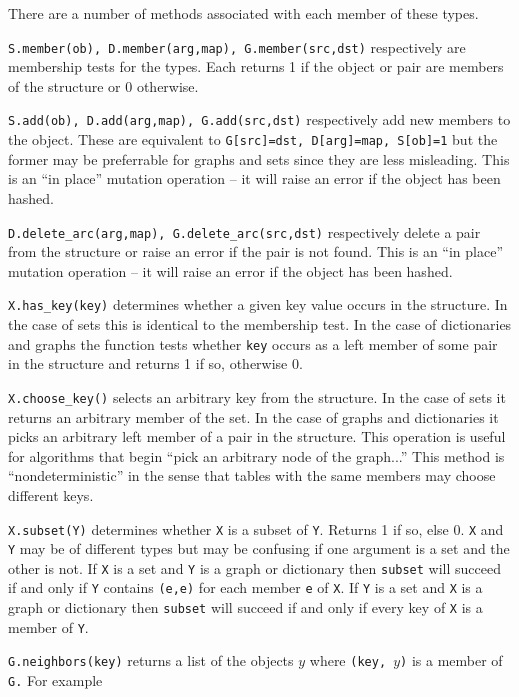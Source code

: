 There are a number of methods associated with each member of these
types.
\begin{description}
%
\item{\tt S.member(ob), D.member(arg,map), G.member(src,dst)}
respectively are membership tests for the types.  Each returns 1 if the object
or pair are members of the structure or 0 otherwise.
%
\item{\tt S.add(ob), D.add(arg,map), G.add(src,dst)}
respectively add new members to the object. These are equivalent to
{\tt G[src]=dst, D[arg]=map, S[ob]=1} but the former may be
preferrable for graphs and sets since they are less misleading.
This is an ``in place'' mutation operation -- it will raise an
error if the object has been hashed.
%
\item{\tt D.delete\_arc(arg,map), G.delete\_arc(src,dst)}
respectively delete a pair from the structure or raise an
error if the pair is not found.
This is an ``in place'' mutation operation -- it will raise an
error if the object has been hashed.
%
\item{\tt X.has\_key(key)}
determines whether a given key value occurs in the structure.
In the case of sets this is identical to the membership test.
In the case of dictionaries and graphs the function tests
whether {\tt key} occurs as a left member of some pair in the
structure and returns 1 if so, otherwise 0.
%
\item{\tt X.choose\_key()} selects an arbitrary key from the structure.
In the case of sets it returns an arbitrary member of the set.
In the case of graphs and dictionaries it picks an arbitrary left
member of a pair in the structure.  This operation is useful for
algorithms that begin ``pick an arbitrary node of the graph...''
This method is ``nondeterministic'' in the sense that tables with
the same members may choose different keys.
%
\item{\tt X.subset(Y)}
determines whether {\tt X} is a subset of {\tt Y}.
Returns 1 if so, else 0.  {\tt X} and {\tt Y} may be of different
types but may be confusing if one argument is a set and the other
is not.
If {\tt X} is a set and {\tt Y} is a graph or dictionary
then {\tt subset} will succeed if and only if {\tt Y} contains {\tt (e,e)}
for each member {\tt e} of {\tt X}.
If {\tt Y} is a set and {\tt X} is a graph or dictionary
then {\tt subset} will succeed if and only if every key of
{\tt X} is a member of {\tt Y}.
%
\item{\tt G.neighbors(key)}
returns a list of the objects $y$ where {\tt (key, $y$)} is
a member of {\tt G.}  For example

\end{description}
